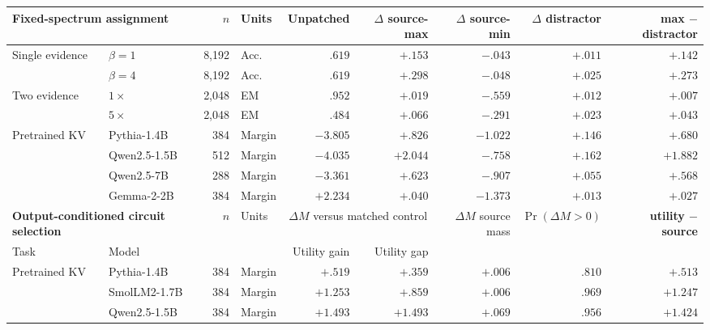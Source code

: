 \documentclass[letterpaper]{article} %
\newcommand{\helpful}[1]{\textcolor{pennblue}{\bfseries #1}}
\newcommand{\harmful}[1]{\textcolor{pennred}{\bfseries #1}}
\newcommand{\neutral}[1]{\textcolor{controlgray}{#1}}
\begin{document}
\begin{table}[!t]
\centering
\scriptsize
\setlength{\tabcolsep}{1.8pt}
\begin{tabular*}{\textwidth}{@{\extracolsep{\fill}}llrlrrrrr}
\toprule
\multicolumn{2}{l}{\textbf{Fixed-spectrum assignment}} & $n$ & Units & Unpatched & $\Delta$ source-max & $\Delta$ source-min & $\Delta$ distractor & \textbf{max $-$ distractor} \\
\midrule
Single evidence & $\beta=1$ & 8,192 & Acc. & $.619$ & \helpful{$+.153$} & \harmful{$-.043$} & \neutral{$+.011$} & \helpful{$+.142$} \\
 & $\beta=4$ & 8,192 & Acc. & $.619$ & \helpful{$+.298$} & \harmful{$-.048$} & \neutral{$+.025$} & \helpful{$+.273$} \\
\midrule
Two evidence & $1\times$ & 2,048 & EM & $.952$ & \helpful{$+.019$} & \harmful{$-.559$} & \neutral{$+.012$} & \helpful{$+.007$} \\
 & $5\times$ & 2,048 & EM & $.484$ & \helpful{$+.066$} & \harmful{$-.291$} & \neutral{$+.023$} & \helpful{$+.043$} \\
\midrule
Pretrained KV & Pythia-1.4B & 384 & Margin & $-3.805$ & \helpful{$+.826$} & \harmful{$-1.022$} & \neutral{$+.146$} & \helpful{$+.680$} \\
 & Qwen2.5-1.5B & 512 & Margin & $-4.035$ & \helpful{$+2.044$} & \harmful{$-.758$} & \neutral{$+.162$} & \helpful{$+1.882$} \\
 & Qwen2.5-7B & 288 & Margin & $-3.361$ & \helpful{$+.623$} & \harmful{$-.907$} & \neutral{$+.055$} & \helpful{$+.568$} \\
 & Gemma-2-2B & 384 & Margin & $+2.234$ & \helpful{$+.040$} & \harmful{$-1.373$} & \neutral{$+.013$} & \helpful{$+.027$} \\
\midrule
\multicolumn{2}{l}{\textbf{Output-conditioned circuit selection}} & $n$ & Units & \multicolumn{2}{c}{$\Delta M$ versus matched control} & $\Delta M$ source mass & $\Pr(\Delta M>0)$ & \textbf{utility $-$ source} \\
\cmidrule(lr){5-6}
Task & Model & & & Utility gain & Utility gap & & & \\
\midrule
Pretrained KV & Pythia-1.4B & 384 & Margin & \helpful{$+.519$} & \helpful{$+.359$} & \neutral{$+.006$} & $.810$ & \helpful{$+.513$} \\
 & SmolLM2-1.7B & 384 & Margin & \helpful{$+1.253$} & \helpful{$+.859$} & \neutral{$+.006$} & $.969$ & \helpful{$+1.247$} \\
 & Qwen2.5-1.5B & 384 & Margin & \helpful{$+1.493$} & \helpful{$+1.493$} & \helpful{$+.069$} & $.956$ & \helpful{$+1.424$} \\

\end{tabular*}
\end{table}
\end{document}
